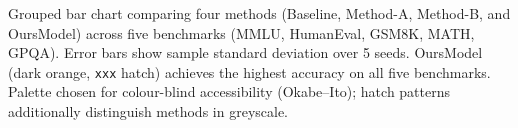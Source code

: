 \caption{Grouped bar chart comparing four methods (Baseline, Method-A, Method-B, and OursModel) across five benchmarks (MMLU, HumanEval, GSM8K, MATH, GPQA). Error bars show sample standard deviation over 5 seeds. OursModel (dark orange, \texttt{xxx} hatch) achieves the highest accuracy on all five benchmarks. Palette chosen for colour-blind accessibility (Okabe--Ito); hatch patterns additionally distinguish methods in greyscale.}
